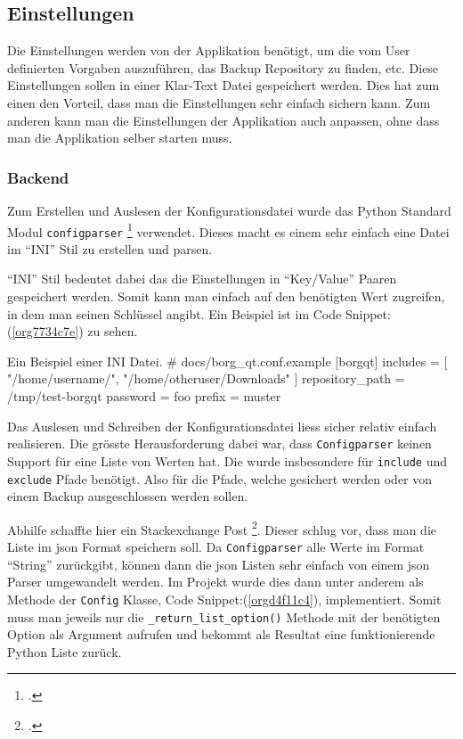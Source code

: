 \subsection{Einstellungen}
\label{sec:org9933429}

Die Einstellungen werden von der Applikation benötigt, um die vom User
definierten Vorgaben auszuführen, das Backup Repository zu finden, etc.
Diese Einstellungen sollen in einer Klar-Text Datei gespeichert werden. Dies
hat zum einen den Vorteil, dass man die Einstellungen sehr einfach sichern kann.
Zum anderen kann man die Einstellungen der Applikation auch anpassen, ohne dass
man die Applikation selber starten muss.

\subsubsection{Backend}
\label{sec:org93cdc4e}

Zum Erstellen und Auslesen der Konfigurationsdatei wurde das Python Standard
Modul \texttt{configparser} \footcite{configparser} verwendet. Dieses macht es einem
sehr einfach eine Datei im "`INI"' Stil zu erstellen und parsen.

"`INI"' Stil bedeutet dabei das die Einstellungen in "`Key/Value"' Paaren
gespeichert werden. Somit kann man einfach auf den benötigten Wert zugreifen, in
dem man seinen Schlüssel angibt. Ein Beispiel ist im Code Snippet:
(\ref{org7734c7e}) zu sehen.

\begin{sexylisting}{Ein Beispiel einer INI Datei.}
# docs/borg_qt.conf.example
[borgqt]
includes = [
	    "/home/username/",
        "/home/otheruser/Downloads"
	]
repository_path = /tmp/test-borgqt
password = foo
prefix = muster
\end{sexylisting}

Das Auslesen und Schreiben der Konfigurationsdatei liess sicher relativ einfach
realisieren. Die grösste Herausforderung dabei war, dass \texttt{Configparser} keinen
Support für eine Liste von Werten hat. Die wurde insbesondere für \texttt{include} und
\texttt{exclude} Pfade benötigt. Also für die Pfade, welche gesichert werden oder von
einem  Backup ausgeschlossen werden sollen.

Abhilfe schaffte hier ein Stackexchange Post \footcite{configlist}. Dieser schlug
vor, dass man die Liste im \gls{json} Format speichern soll. Da \texttt{Configparser} alle
Werte im Format "`String"' zurückgibt, können dann die \gls{json} Listen sehr
einfach von einem \gls{json} Parser umgewandelt werden. Im Projekt wurde dies
dann unter anderem als Methode der \texttt{Config} Klasse, Code
Snippet:(\ref{orgd4f11c4}), implementiert. Somit muss man jeweils nur die
\texttt{\_return\_list\_option()} Methode mit der benötigten Option als Argument aufrufen
und bekommt als Resultat eine funktionierende Python Liste zurück.

